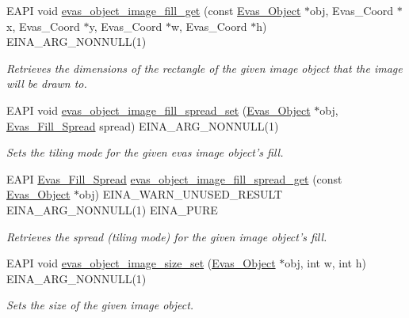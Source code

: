 \begin{DoxyCompactItemize}
EAPI void \hyperlink{group__Evas__Object__Image_gaf1a7d6b8cf914234abdd5d3d3312f85e}{evas\_\-object\_\-image\_\-fill\_\-get} (const \hyperlink{group__Evas__Object__Group_ga9e19e6dd1f517a0ba437c0114d3e7c97}{Evas\_\-Object} $\ast$obj, Evas\_\-Coord $\ast$x, Evas\_\-Coord $\ast$y, Evas\_\-Coord $\ast$w, Evas\_\-Coord $\ast$h) EINA\_\-ARG\_\-NONNULL(1)
\begin{DoxyCompactList}\small\item\em Retrieves the dimensions of the rectangle of the given image object that the image will be drawn to. \item\end{DoxyCompactList}\item 
EAPI void \hyperlink{group__Evas__Object__Image_ga0015a660507a5562e118a1777947f881}{evas\_\-object\_\-image\_\-fill\_\-spread\_\-set} (\hyperlink{group__Evas__Object__Group_ga9e19e6dd1f517a0ba437c0114d3e7c97}{Evas\_\-Object} $\ast$obj, \hyperlink{Evas_8h_a693bc9123af8452d9771c2a849b8805c}{Evas\_\-Fill\_\-Spread} spread) EINA\_\-ARG\_\-NONNULL(1)
\begin{DoxyCompactList}\small\item\em Sets the tiling mode for the given evas image object's fill. \item\end{DoxyCompactList}\item 
EAPI \hyperlink{Evas_8h_a693bc9123af8452d9771c2a849b8805c}{Evas\_\-Fill\_\-Spread} \hyperlink{group__Evas__Object__Image_gae86928005f983627c74dbaef6c0fbb0e}{evas\_\-object\_\-image\_\-fill\_\-spread\_\-get} (const \hyperlink{group__Evas__Object__Group_ga9e19e6dd1f517a0ba437c0114d3e7c97}{Evas\_\-Object} $\ast$obj) EINA\_\-WARN\_\-UNUSED\_\-RESULT EINA\_\-ARG\_\-NONNULL(1) EINA\_\-PURE
\begin{DoxyCompactList}\small\item\em Retrieves the spread (tiling mode) for the given image object's fill. \item\end{DoxyCompactList}\item 
EAPI void \hyperlink{group__Evas__Object__Image_gaf85031267b5fab16874ebbf944dded22}{evas\_\-object\_\-image\_\-size\_\-set} (\hyperlink{group__Evas__Object__Group_ga9e19e6dd1f517a0ba437c0114d3e7c97}{Evas\_\-Object} $\ast$obj, int w, int h) EINA\_\-ARG\_\-NONNULL(1)
\begin{DoxyCompactList}\small\item\em Sets the size of the given image object. \item\end{DoxyCompactList}\item 

\end{DoxyCompactItemize}
